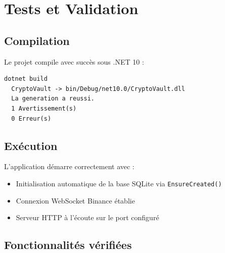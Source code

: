 \documentclass[12pt,a4paper]{article}
\begin{document}
\section{Tests et Validation}

\subsection{Compilation}

Le projet compile avec succès sous .NET 10 :

\begin{verbatim}
dotnet build
  CryptoVault -> bin/Debug/net10.0/CryptoVault.dll
  La generation a reussi.
  1 Avertissement(s)
  0 Erreur(s)
\end{verbatim}

\subsection{Exécution}

L'application démarre correctement avec :
\begin{itemize}
    \item Initialisation automatique de la base SQLite via \texttt{EnsureCreated()}
    \item Connexion WebSocket Binance établie
    \item Serveur HTTP à l'écoute sur le port configuré
\end{itemize}

\subsection{Fonctionnalités vérifiées}
\end{document}
